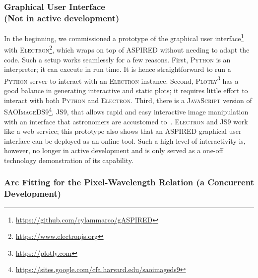 \documentclass[linenumbers, twocolumn]{aastex631}
\begin{document}
\subsubsection*{Graphical User Interface\\(Not in active development)}
In the beginning, we commissioned a prototype of the graphical user
interface\footnote{\url{https://github.com/cylammarco/gASPIRED}} with
\textsc{Electron}\footnote{\url{https://www.electronjs.org}}, which wraps on
top of \textsc{ASPIRED} without needing to adapt the code. Such a setup works seamlessly
for a few reasons. First, \textsc{Python} is an interpreter; it can
execute in run time. It is hence straightforward to run a \textsc{Python} server to
interact with an \textsc{Electron} instance. Second,
\textsc{Plotly}\footnote{\url{https://plotly.com}} has a good balance in
generating interactive and static plots; it requires little effort to interact
with both \textsc{Python} and \textsc{Electron}. Third, there is a
\textsc{JavaScript} version of
\textsc{SAOImageDS9}\footnote{\url{https://sites.google.com/cfa.harvard.edu/saoimageds9}}, \textsc{JS9},
that allows rapid and easy interactive image manipulation with an interface
that astronomers are accustomed to~\citep{2003ASPC..295..489J, eric_mandel_2022_6675771}.
\textsc{Electron} and \textsc{JS9} work like a web service; this prototype also
shows that an \textsc{ASPIRED} graphical user
interface can be deployed as an online tool. Such a high level of
interactivity is, however, no longer in active development and is only served
as a one-off technology demonstration of its capability.

\subsubsection*{Arc Fitting for the Pixel-Wavelength Relation (a Concurrent Development)}
\end{document}

